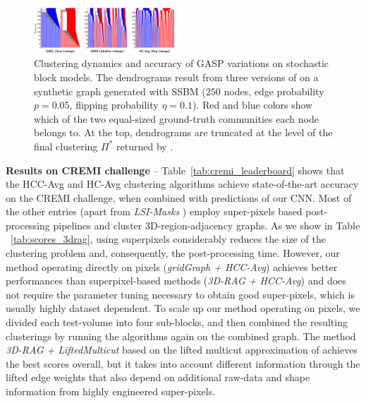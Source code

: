 \begin{figure}
\centering
\includegraphics[width=0.48\textwidth,trim=0 10 60 0, clip]{./figures/GASP/dendrograms/new_agglo_order.png} %
\caption{Clustering dynamics and accuracy of GASP variations on stochastic block models. The dendrograms result from three versions of \algname{} on a synthetic graph generated with SSBM ($250$ nodes, edge probability $p=0.05$, flipping probability $\eta=0.1$).  Red and blue colors show which of the two equal-sized ground-truth communities each node belongs to. At the top, dendrograms are truncated at the level of the final clustering $\Pi^*$ returned by \algname{}. \label{fig:dendrograms}}
\end{figure}






\textbf{Results on CREMI challenge} -- 
Table~\ref{tab:cremi_leaderboard} shows that the HCC-Avg and HC-Avg clustering algorithms achieve state-of-the-art accuracy on the CREMI challenge, when combined with predictions of our CNN.
Most of the other entries (apart from \emph{LSI-Masks} \cite{bailoni2020proposal}) employ super-pixels based post-processing pipelines and cluster 3D-region-adjacency graphs. As we show in Table ~\ref{tab:scores_3drag}, using superpixels considerably reduces the size of the clustering problem and, consequently, the post-processing time. 
However, our method operating directly on pixels (\emph{gridGraph + HCC-Avg}) achieves better performances than superpixel-based methods (\emph{3D-RAG + HCC-Avg}) and does not require the parameter tuning necessary to obtain good super-pixels, which is usually highly dataset dependent.
To scale up our method operating on pixels, we divided each test-volume into four sub-blocks, and then combined the resulting clusterings by running the algorithms again on the combined graph.
The method \emph{3D-RAG + LiftedMulticut} based on the lifted multicut approximation of \cite{beier2017multicut} achieves the best scores overall, but it takes into account different information through the lifted edge weights that also depend on additional raw-data and shape information from highly engineered super-pixels. 

